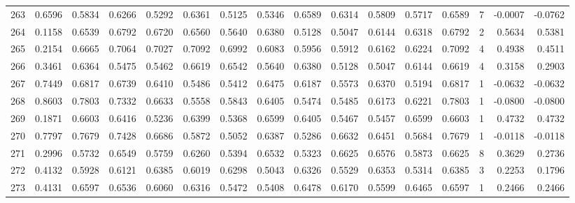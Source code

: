 \begin{tabular}{lrrrrrrrrrrrrrrr}
263 &      0.6596 &  0.5834 &  0.6266 &  0.5292 &  0.6361 &  0.5125 &  0.5346 &  0.6589 &  0.6314 &  0.5809 &   0.5717 &     0.6589 &      7 &                   -0.0007 &                    -0.0762 \\
264 &      0.1158 &  0.6539 &  0.6792 &  0.6720 &  0.6560 &  0.5640 &  0.6380 &  0.5128 &  0.5047 &  0.6144 &   0.6318 &     0.6792 &      2 &                    0.5634 &                     0.5381 \\
265 &      0.2154 &  0.6665 &  0.7064 &  0.7027 &  0.7092 &  0.6992 &  0.6083 &  0.5956 &  0.5912 &  0.6162 &   0.6224 &     0.7092 &      4 &                    0.4938 &                     0.4511 \\
266 &      0.3461 &  0.6364 &  0.5475 &  0.5462 &  0.6619 &  0.6542 &  0.5640 &  0.6380 &  0.5128 &  0.5047 &   0.6144 &     0.6619 &      4 &                    0.3158 &                     0.2903 \\
267 &      0.7449 &  0.6817 &  0.6739 &  0.6410 &  0.5486 &  0.5412 &  0.6475 &  0.6187 &  0.5573 &  0.6370 &   0.5194 &     0.6817 &      1 &                   -0.0632 &                    -0.0632 \\
268 &      0.8603 &  0.7803 &  0.7332 &  0.6633 &  0.5558 &  0.5843 &  0.6405 &  0.5474 &  0.5485 &  0.6173 &   0.6221 &     0.7803 &      1 &                   -0.0800 &                    -0.0800 \\
269 &      0.1871 &  0.6603 &  0.6416 &  0.5236 &  0.6399 &  0.5368 &  0.6599 &  0.6405 &  0.5467 &  0.5457 &   0.6599 &     0.6603 &      1 &                    0.4732 &                     0.4732 \\
270 &      0.7797 &  0.7679 &  0.7428 &  0.6686 &  0.5872 &  0.5052 &  0.6387 &  0.5286 &  0.6632 &  0.6451 &   0.5684 &     0.7679 &      1 &                   -0.0118 &                    -0.0118 \\
271 &      0.2996 &  0.5732 &  0.6549 &  0.5759 &  0.6260 &  0.5394 &  0.6532 &  0.5323 &  0.6625 &  0.6576 &   0.5873 &     0.6625 &      8 &                    0.3629 &                     0.2736 \\
272 &      0.4132 &  0.5928 &  0.6121 &  0.6385 &  0.6019 &  0.6298 &  0.5043 &  0.6326 &  0.5529 &  0.6353 &   0.5314 &     0.6385 &      3 &                    0.2253 &                     0.1796 \\
273 &      0.4131 &  0.6597 &  0.6536 &  0.6060 &  0.6316 &  0.5472 &  0.5408 &  0.6478 &  0.6170 &  0.5599 &   0.6465 &     0.6597 &      1 &                    0.2466 &                     0.2466 \\

\end{tabular}
